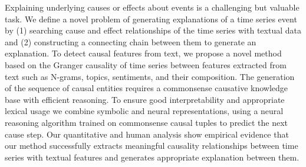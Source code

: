 Explaining underlying causes or effects about events is a challenging but valuable task. We define a novel problem of generating explanations of a time series event by (1) searching cause and effect relationships of the time series with textual data and (2) constructing a connecting chain between them to generate an explanation. To detect causal features from text, we propose a novel method based on the Granger causality of time series between features extracted from text such as N-grams, topics, sentiments, and their composition. The generation of the sequence of causal entities requires a commonsense causative knowledge base with efficient reasoning. To ensure good interpretability and appropriate lexical usage we combine symbolic and neural representations, using a neural reasoning algorithm trained on commonsense causal tuples to predict the next cause step. Our quantitative and human analysis show empirical evidence that our method successfully extracts meaningful causality relationships between time series with textual features and generates appropriate explanation between them.
